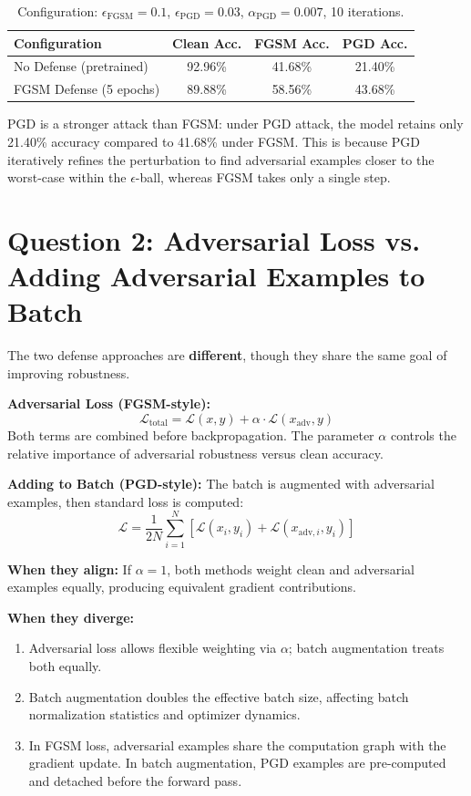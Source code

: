 \documentclass[11pt]{article}
\begin{document}
\begin{table}[h]
\centering
\begin{tabular}{lccc}
\toprule
\textbf{Configuration} & \textbf{Clean Acc.} & \textbf{FGSM Acc.} & \textbf{PGD Acc.} \\
\midrule
No Defense (pretrained) & 92.96\% & 41.68\% & 21.40\% \\
FGSM Defense (5 epochs) & 89.88\% & 58.56\% & 43.68\% \\
\bottomrule
\end{tabular}
\caption{Configuration: $\epsilon_{\text{FGSM}}=0.1$, $\epsilon_{\text{PGD}}=0.03$, $\alpha_{\text{PGD}}=0.007$, 10 iterations.}
\end{table}

PGD is a stronger attack than FGSM: under PGD attack, the model retains only 21.40\% accuracy compared to 41.68\% under FGSM. This is because PGD iteratively refines the perturbation to find adversarial examples closer to the worst-case within the $\epsilon$-ball, whereas FGSM takes only a single step.

\section{Question 2: Adversarial Loss vs. Adding Adversarial Examples to Batch}

The two defense approaches are \textbf{different}, though they share the same goal of improving robustness.

\textbf{Adversarial Loss (FGSM-style):}
\[
\mathcal{L}_{\text{total}} = \mathcal{L}(x, y) + \alpha \cdot \mathcal{L}(x_{\text{adv}}, y)
\]
Both terms are combined before backpropagation. The parameter $\alpha$ controls the relative importance of adversarial robustness versus clean accuracy.

\textbf{Adding to Batch (PGD-style):}
The batch is augmented with adversarial examples, then standard loss is computed:
\[
\mathcal{L} = \frac{1}{2N}\sum_{i=1}^{N}\left[\mathcal{L}(x_i, y_i) + \mathcal{L}(x_{\text{adv},i}, y_i)\right]
\]

\textbf{When they align:} If $\alpha = 1$, both methods weight clean and adversarial examples equally, producing equivalent gradient contributions.

\textbf{When they diverge:}
\begin{enumerate}
    \item Adversarial loss allows flexible weighting via $\alpha$; batch augmentation treats both equally.
    \item Batch augmentation doubles the effective batch size, affecting batch normalization statistics and optimizer dynamics.
    \item In FGSM loss, adversarial examples share the computation graph with the gradient update. In batch augmentation, PGD examples are pre-computed and detached before the forward pass.
\end{enumerate}
\end{document}
